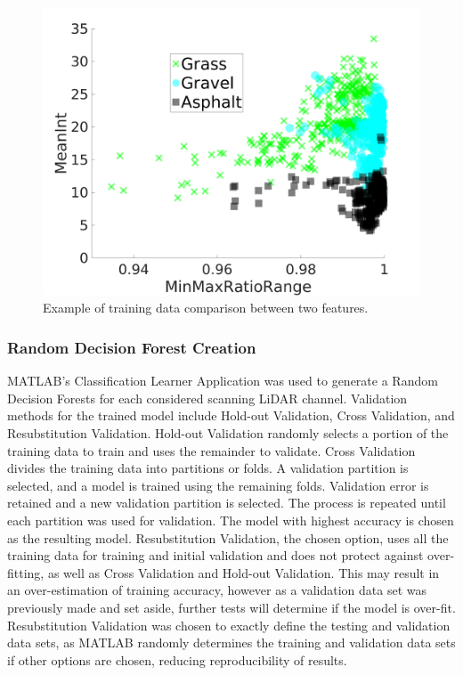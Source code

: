 \documentclass[numbered,pdftex]{ohio-etd}
\begin{document}
{{{{				\begin{figure}[H]
					\centering
					\includegraphics[width=0.75\linewidth]{Defense_Images/training_data_cluster_3}
					\caption[Example Clustering]{Example of training data comparison between two features.}
					\label{fig:range_training_data_cluster_3}
				\end{figure}
				
			} %
			
			\subsubsection{Random Decision Forest Creation}\label{sec:random-decision-forest-creation}{
				
				{MATLAB's Classification Learner Application was used to generate a Random Decision Forests for each considered scanning LiDAR channel. Validation methods for the trained model include Hold-out Validation, Cross Validation, and Resubstitution Validation. Hold-out Validation randomly selects a portion of the training data to train and uses the remainder to validate. Cross Validation divides the training data into partitions or folds. A validation partition is selected, and a model is trained using the remaining folds. Validation error is retained and a new validation partition is selected. The process is repeated until each partition was used for validation. The model with highest accuracy is chosen as the resulting model. Resubstitution Validation, the chosen option, uses all the training data for training and initial validation and does not protect against over-fitting, as well as Cross Validation and Hold-out Validation. This may result in an over-estimation of training accuracy, however as a validation data set was previously made and set aside, further tests will determine if the model is over-fit. Resubstitution Validation was chosen to exactly define the testing and validation data sets, as MATLAB randomly determines the training and validation data sets if other options are chosen, reducing reproducibility of results.}
				
}}}}
\end{document}
